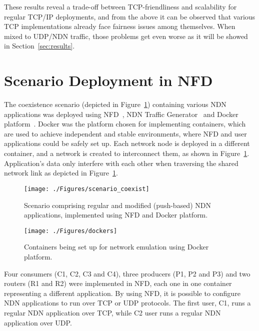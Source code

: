 \documentclass[11pt,conference]{./IEEEtran}
\begin{document}
	These results reveal a trade-off between TCP-friendliness and scalability for regular TCP/IP deployments, and from the above it can be observed that various TCP implementations already face fairness issues among themselves. When mixed to UDP/NDN traffic, those problems get even worse as it will be showed in Section~\ref{sec:results}.


	\section{Scenario Deployment in NFD}  \label{sec:scenario}

	The coexistence scenario (depicted in Figure~\ref{fig:scenario_coexist}) containing various NDN applications was deployed using NFD~\cite{nfd}, NDN Traffic Generator~\cite{ndntg} and Docker platform~\cite{docker}. Docker was the platform chosen for implementing containers, which are used to achieve independent and stable environments, where NFD and user applications could be safely set up. Each network node is deployed in a different container, and a network is created to interconnect them, as shown in Figure~\ref{fig:scenario_coexist}. Application's data only interfere with each other when traversing the shared network link as depicted in Figure~\ref{fig:scenario_coexist}.

		\begin{figure}[ht]
			\centering
			\texttt{[image: ./Figures/scenario\_coexist]}
			\caption{Scenario comprising regular and modified (push-based) NDN applications, implemented using NFD and Docker platform.}
			\label{fig:scenario_coexist}
		\end{figure} 

		\begin{figure}[ht]
			\centering
			\texttt{[image: ./Figures/dockers]}
			\caption{Containers being set up for network emulation using Docker platform.}
			\label{fig:docker}
		\end{figure} 

	Four consumers (C1, C2, C3 and C4), three producers (P1, P2 and P3) and two routers (R1 and R2) were implemented in NFD, each one in one container representing a different application. By using NFD, it is possible to configure NDN applications to run over TCP or UDP protocols. The first user, C1, runs a regular NDN application over TCP, while  C2 user runs a regular NDN application over UDP. 
\end{document}
